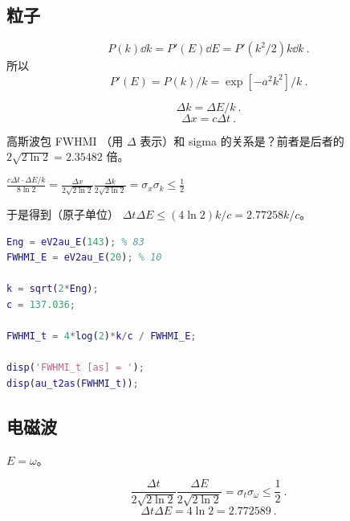 
\subsection{粒子}
\begin{equation}
P(k)\dd{k} = P'(E)\dd{E} = P'(k^2/2)k\dd{k}~.
\end{equation}
所以
\begin{equation}
P'(E) = P(k)/k = \exp[-a^2 k^2]/k~.
\end{equation}

\begin{equation}
\Delta k = \Delta E/k~.
\end{equation}
\begin{equation}
\Delta x = c\Delta t~.
\end{equation}


高斯波包 FWHMI （用 $\Delta$ 表示）和 sigma 的关系是？前者是后者的 $2\sqrt{2\ln 2} = 2.35482$ 倍。

$\frac{c\Delta t \cdot \Delta E/k}{8\ln 2} = \frac{\Delta x}{2\sqrt{2\ln 2}}\frac{\Delta k}{2\sqrt{2\ln 2}} = \sigma_x \sigma_k \leq \frac{1}{2}$

于是得到（原子单位） $\Delta t\Delta E \leq (4\ln 2)k/c = 2.77258 k/c$。

\begin{lstlisting}[language=matlab]
Eng = eV2au_E(143); % 83
FWHMI_E = eV2au_E(20); % 10

k = sqrt(2*Eng);
c = 137.036;

FWHMI_t = 4*log(2)*k/c / FWHMI_E;

disp('FWHMI_t [as] = ');
disp(au_t2as(FWHMI_t));
\end{lstlisting}

\subsection{电磁波}
$E = \omega$。

\begin{equation}
\frac{\Delta t}{2\sqrt{2\ln 2}}\frac{\Delta E}{2\sqrt{2\ln 2}} = \sigma_t \sigma_\omega \leq \frac{1}{2}~.
\end{equation}
\begin{equation}
\Delta t\Delta E = 4\ln 2 = 2.772589~.
\end{equation}
